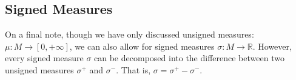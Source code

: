 \documentclass[12pt]{article}
\begin{document}
\subsection*{Signed Measures}

On a final note, though we have only discussed unsigned measures:
$\mu : M \rightarrow [0,+\infty]$, we can also allow for signed measures
$\sigma : M \rightarrow \mathbb{R}$.
However, every signed measure $\sigma$ can be decomposed into the difference
between two unsigned measures $\sigma^+$ and $\sigma^-$.
That is,
$\sigma = \sigma^+ - \sigma^-$.
\end{document}
